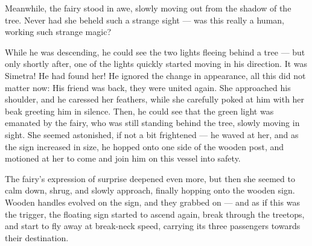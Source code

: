 Meanwhile, the fairy stood in awe, slowly moving out from the shadow of the tree. Never had she beheld such a strange sight --- was this really a human, working such strange magic?

\froufrou{}

While he was descending, he could see the two lights fleeing behind a tree --- but only shortly after, one of the lights quickly started moving in his direction. It was Simetra! He had found her! 
He ignored the change in appearance, all this did not matter now: His friend was back, they were united again. She approached his shoulder, and he caressed her feathers, while she carefully poked at him with her beak greeting him in silence. Then, he could see that the green light was emanated by the fairy, who was still standing behind the tree, slowly moving in sight. She seemed astonished, if not a bit frightened --- he waved at her, and as the sign increased in size, he hopped onto one side of the wooden post, and motioned at her to come and join him on this vessel into safety.

The fairy's expression of surprise deepened even more, but then she seemed to calm down, shrug, and slowly approach, finally hopping onto the wooden sign. Wooden handles evolved on the sign, and they grabbed on --- and as if this was the trigger, the floating sign started to ascend again, break through the treetops, and start to fly away at break-neck speed, carrying its three passengers towards their destination.
